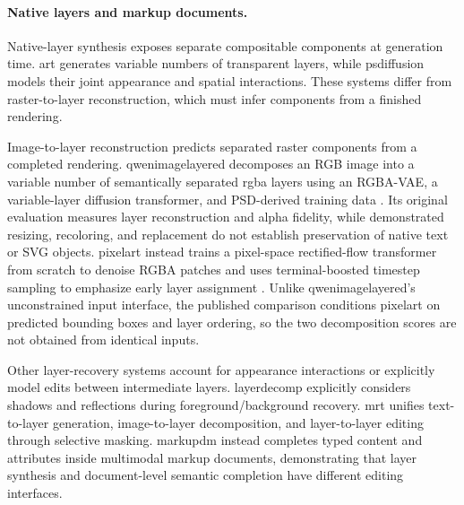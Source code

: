 \paragraph{Native layers and markup documents.}
Native-layer synthesis exposes separate compositable components at generation time.
\ac{art} generates variable numbers of transparent layers, while \ac{psdiffusion} models their joint appearance and spatial interactions.
These systems differ from raster-to-layer reconstruction, which must infer components from a finished rendering.

Image-to-layer reconstruction predicts separated raster components from a completed rendering.
\ac{qwenimagelayered} decomposes an RGB image into a variable number of semantically separated \ac{rgba} layers using an RGBA-VAE, a variable-layer diffusion transformer, and PSD-derived training data \citep{qwenimagelayered2026}.
Its original evaluation measures layer reconstruction and alpha fidelity, while demonstrated resizing, recoloring, and replacement do not establish preservation of native text or SVG objects.
\ac{pixelart} instead trains a pixel-space rectified-flow transformer from scratch to denoise RGBA patches and uses terminal-boosted timestep sampling to emphasize early layer assignment \citep{jia2026pixelart}.
Unlike \ac{qwenimagelayered}'s unconstrained input interface, the published comparison conditions \ac{pixelart} on predicted bounding boxes and layer ordering, so the two decomposition scores are not obtained from identical inputs.

Other layer-recovery systems account for appearance interactions or explicitly model edits between intermediate layers.
\ac{layerdecomp} explicitly considers shadows and reflections during foreground/background recovery.
\ac{mrt} unifies text-to-layer generation, image-to-layer decomposition, and layer-to-layer editing through selective masking.
\ac{markupdm} instead completes typed content and attributes inside multimodal markup documents, demonstrating that layer synthesis and document-level semantic completion have different editing interfaces.

